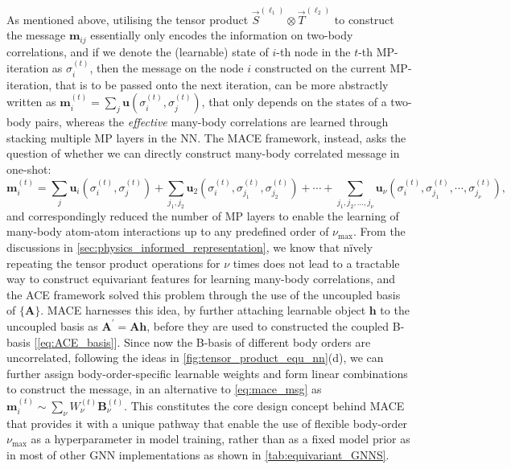 As mentioned above, utilising  the tensor product $\vec{S}^{(\ell_1)}\otimes\vec{T}^{(\ell_2)}$ to construct the message $\bm{m}_{ij}$ essentially only encodes the information on two-body correlations, and if we denote the (learnable) state of $i$-th node in the $t$-th MP-iteration as $\sigma_i^{(t)}$, then the message on the node $i$ constructed on the current MP-iteration, that is to be passed onto the next iteration, can be more abstractly written as $\bm{m}_i^{(t)}=\sum_{j}\bm{u}(\sigma_i^{(t)},\sigma_j^{(t)})$, that only depends on the states of a two-body pairs, whereas the \emph{effective} many-body correlations are learned through stacking multiple MP layers in the NN. The MACE\cite{batatia2022mace} framework, instead, asks the question of whether we can directly construct many-body correlated message in one-shot:
\begin{equation}
    \label{eq:mace_msg}
    \bm{m}_i^{(t)}=\sum_{j}\bm{u}_i\left(\sigma_i^{(t)},\sigma_j^{(t)}\right)+\sum_{j_1,j_2}\bm{u}_2\left(\sigma_i^{(t)},\sigma_{j_1}^{(t)},\sigma_{j_2}^{(t)}\right)+\cdots+\sum_{j_1,j_2,\ldots,j_\nu}\bm{u}_{\nu}\left(\sigma_i^{(t)},\sigma_{j_1}^{(t)},\cdots,\sigma_{j_\nu}^{(t)}\right),
\end{equation}
and correspondingly reduced the number of MP layers to enable the learning of many-body atom-atom interactions up to any predefined order of $\nu_{\max}$. From the discussions in \cref{sec:physics_informed_representation}, we know that n\"{i}vely repeating the tensor product operations for $\nu$ times does not lead to a tractable way to construct equivariant features for learning many-body correlations, and the ACE framework solved this problem through the use of the uncoupled basis of $\{\bm{A}\}$. MACE harnesses this idea, by further attaching learnable object $\bm{h}$ to the uncoupled basis as $\bm{A}^\prime=\bm{A}\bm{h}$, before they are used to constructed the coupled B-basis [\cref{eq:ACE_basis}].  Since now the B-basis of different body orders are uncorrelated, following the ideas in \cref{fig:tensor_product_equ_nn}(d), we can further assign body-order-specific learnable weights and form linear combinations to construct the message, in an alternative  to \cref{eq:mace_msg} as $\bm{m}_i^{(t)}\sim\sum_{\nu}W^{(t)}_{\nu}\bm{B}_{\nu}^{(t)}$. This constitutes the core design concept behind MACE that provides it with a unique pathway that enable the use of flexible body-order $\nu_{\max}$ as a hyperparameter in model training, rather than as a fixed model prior as in most of other GNN implementations as shown in \cref{tab:equivariant_GNNS}. 


